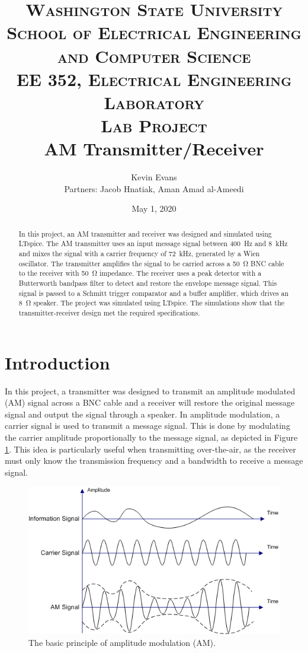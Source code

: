 \documentclass[11pt,letter,notitlepage]{article}
\title{
	\textsc{ \small
		Washington State University \\
		School of Electrical Engineering and Computer Science \\
		EE 352, Electrical Engineering Laboratory
	} \\
	{\textsc{\small Lab Project}} \\
	AM Transmitter/Receiver
}
\author{Kevin Evans \\
\small{Partners: Jacob Hnatiak, Aman Amad al-Ameedi}}
\date{May 1, 2020}
\begin{document}
	
	\maketitle
	\begin{abstract}
		\noindent In this project, an AM transmitter and receiver was designed and simulated using LTspice. The AM transmitter uses an input message signal between \SI{400}{\Hz} and \SI{8}{\kHz} and mixes the signal with a carrier frequency of \SI{72}{\kHz}, generated by a Wien oscillator. The transmitter amplifies the signal to be carried across a \SI{50}{\ohm} BNC cable to the receiver with \SI{50}{\ohm} impedance. The receiver uses a peak detector with a Butterworth bandpass filter to detect and restore the envelope message signal. This signal is passed to a Schmitt trigger comparator and a buffer amplifier, which drives an \SI{8}{\ohm} speaker. The project was simulated using LTspice. The simulations show that the transmitter-receiver design met the required specifications.
	\end{abstract}

	\clearpage
	\section{Introduction}
	In this project, a transmitter was designed to transmit an amplitude modulated (AM) signal across a BNC cable and a receiver will restore the original message signal and output the signal through a speaker. In amplitude modulation, a carrier signal is used to transmit a message signal. This is done by modulating the carrier amplitude proportionally to the message signal, as depicted in Figure \ref{fig:am}. This idea is particularly useful when transmitting over-the-air, as the receiver must only know the transmission frequency and a bandwidth to receive a message signal. 
	
	\begin{figure}[h]
		\centering
		\includegraphics[width=0.7\linewidth]{am}
		\caption{The basic principle of amplitude modulation (AM)\protect\footnotemark.}
		\label{fig:am}
	\end{figure}	
	
\end{document}
